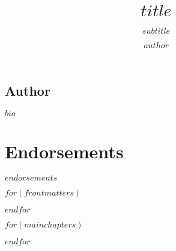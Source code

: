 \documentclass[nemilov1]{Nemilov}
\begin{document}
\frontmatter


\bigskip
\section*{Author}
$bio$


\title{$title$}
\subtitle{$subtitle$}


\author{$author$}

\maketitle

\setcounter{page}{5}

\bigskip

\chapter*{Endorsements}
$endorsements$

\bigskip

\tableofcontents

$for(frontmatters)$

$endfor$



\mainmatter


$for(mainchapters)$

$endfor$

%
%

\appendix

%

\cleardoublepage

\pagestyle{fancy}
\fancyhf{}
\fancyhead[LE]{\nouppercase{\leftmark}}
\fancyhead[RO]{\nouppercase{\rightmark}}




\cleardoublepage
\printindex
\cleardoublepage


\clearpage


\end{document}
